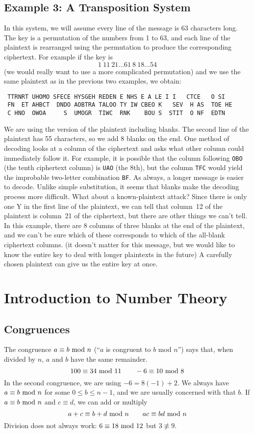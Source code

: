 \subsection*{Example 3: A Transposition System}
In this system, we will assume every line of the message is 63
characters long.  The key is a permutation of the numbers from
1 to 63, and each line of the plaintext is rearranged using the
permutation to produce the corresponding ciphertext.  For example
if the key is $$1\ 11\ 21\dots61\ 8\ 18\dots54$$(we would really want
to use a more complicated permutation) and we use the same
plaintext as in the previous two examples, we obtain:\begin{lst}\tt
TTRNRT UHOMO SFECE HYSGEH REDEN E NHS E A LE I I\ \ \ CTCE\ \ \ O SI\\ \tt
FN\ \ ET AHBCT\ \ DNDO AOBTRA TALOO TY IW CBEO K%
\ \ SEV\ \ H AS\ \ TOE HE\\ \tt
C HNO\ \ OWOA\ \ \ \ \ S\ \ UMOGR\ \ TIWC\ \ RNK%
\ \ \ BOU S\ \ STIT\ \ O NF\ \ EDTN\end{lst}
We are using the version of the plaintext including blanks.  The
second line of the plaintext has 55 characters, so we add 8 blanks
on the end.
\pq One method of decoding looks at a column of the ciphertext and
asks what other column could immediately follow it.  For example,
it is possible that the column following {\tt OBO} (the tenth
ciphertext column) is {\tt UAO} (the 8th), but the column {\tt TFC} would
yield the improbable two-letter combination {\tt BF}.
\pq As always, a longer message is easier to decode.  Unlike simple
substitution, it seems that blanks make the decoding process more 
difficult.
\pq What about a known-plaintext attack? Since there is only one 
Y in the first line of the plaintext, we can tell that column~12
of the plaintext is column~21 of the ciphertext, but there are
other things we can't tell.  In this example, there are 8 columns
of three blanks at the end of the plaintext, and we can't be sure
which of these corresponds to which of the all-blank ciphertext
columns.  (it doesn't matter for this message, but we would like to
know the entire key to deal with longer plaintexts in the future)
A carefully chosen plaintext can give us the entire key at once.
\section{Introduction to Number Theory\label{numth}}\subsection{Congruences}
The congruence $a\equiv b\hbox{ mod }n$ (``$a$ is congruent to $b$ mod $n$'') says that,
when divided by $n$, $a$ and $b$ have the same remainder.
$$100\equiv34\hbox{ mod }11\qquad-6\equiv10\hbox{ mod }8$$
In the second congruence, we are using $-6=8(-1)+2$. We always have
$a\equiv b\hbox{ mod }n$ for some $0\le b\le n-1$, and we are usually concerned with
that $b$.  If $a\equiv b\hbox{ mod }n$ and $c\equiv d$, we can add or multiply
$$a+c\equiv b+d\hbox{ mod }n\qquad ac\equiv bd\hbox{ mod }n$$
Division does not always work: $6\equiv18\hbox{ mod }12$ but $3\not\equiv9$.

